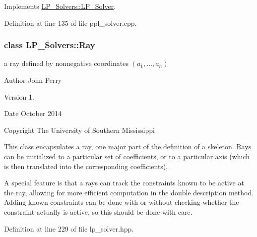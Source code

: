 Implements \hyperlink{group___c_l_s_solvers_aea1a5bf98a2c4c06b0550cacdf8b88fd}{L\+P\+\_\+\+Solvers\+::\+L\+P\+\_\+\+Solver}.



Definition at line 135 of file ppl\+\_\+solver.\+cpp.

\label{class_l_p___solvers_1_1_ray}
\subsubsection{class L\+P\+\_\+\+Solvers\+:\+:Ray}
a ray defined by nonnegative coordinates $(a_1,\ldots,a_n)$ 

\begin{DoxyAuthor}{Author}
John Perry 
\end{DoxyAuthor}
\begin{DoxyVersion}{Version}
1. 
\end{DoxyVersion}
\begin{DoxyDate}{Date}
October 2014 
\end{DoxyDate}
\begin{DoxyCopyright}{Copyright}
The University of Southern Mississippi
\end{DoxyCopyright}
This class encapsulates a ray, one major part of the definition of a skeleton. Rays can be initialized to a particular set of coefficients, or to a particular axis (which is then translated into the corresponding coefficients).

A special feature is that a rays can track the constraints known to be active at the ray, allowing for more efficient computation in the double description method. Adding known constraints can be done with or without checking whether the constraint actually is active, so this should be done with care. 

Definition at line 229 of file lp\+\_\+solver.\+hpp.


